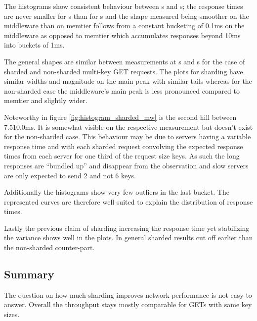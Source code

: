         The histograms show consistent behaviour between \srv{}s and \mw{}s; the response times are never smaller for
        \srv{}s than for \mw{}s and the shape measured being smoother on the middleware than on memtier follows from
        a constant bucketing of 0.1ms on the middleware as opposed to memtier which accumulates responses beyond 10ms
        into buckets of 1ms.

        The general shapes are similar between measurements at \mw{}s and \cli{}s for the case of sharded and
        non-sharded multi-key GET requests. The plots for sharding have similar widths and magnitude on the main peak with
        similar tails whereas for the non-sharded case the middleware's main peak is less pronounced compared to memtier
        and slightly wider.

        Noteworthy in figure \ref{fig:histogram_sharded_mw} is the second hill between 7.5\textendash10.0ms. It is
        somewhat visible on the respective \srv{} measurement but doesn't exist for the non-sharded case. This behaviour
        may be due to servers having a variable response time and with each sharded request convolving the expected
        response times from each server for one third of the request size keys. As such the long responses are ``bundled
        up'' and disappear from the observation and slow servers are only expected to send 2 and not 6 keys.

        Additionally the histograms show very few outliers in the last bucket. The represented curves are therefore well
        suited to explain the distribution of response times.

        Lastly the previous claim of sharding increasing the response time yet stabilizing the variance shows well in
        the plots. In general sharded results cut off earlier than the non-sharded counter-part.

    \subsection{Summary\label{subsec:5_summary}}

        The question on how much sharding improves network performance is not easy to answer. Overall the throughput
        stays mostly comparable for GETs with same key sizes.

